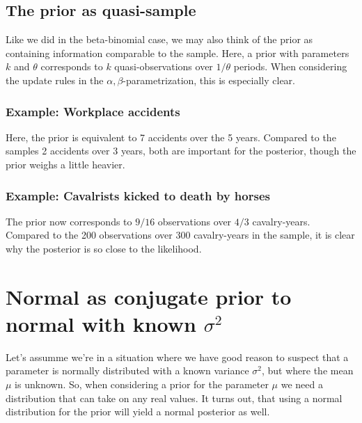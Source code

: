 \documentclass[12pt, a4paper]{article}
\begin{document}
\subsection{The prior as quasi-sample}
Like we did in the beta-binomial case, we may also think of the prior as containing information comparable to the sample. Here, a prior with parameters $k$ and $\theta$ corresponds to $k$ quasi-observations over $1/\theta$ periods. When considering the update rules in the $\alpha, \beta$-parametrization, this is especially clear.

\subsubsection{Example: Workplace accidents}
Here, the prior is equivalent to 7 accidents over the 5 years. Compared to the samples 2 accidents over 3 years, both are important for the posterior, though the prior weighs a little heavier.

\subsubsection{Example: Cavalrists kicked to death by horses}
The prior now corresponds to $9/16$ observations over $4/3$ cavalry-years. Compared to the 200 observations over 300 cavalry-years in the sample, it is clear why the posterior is so close to the likelihood.

\section{Normal as conjugate prior to normal with known $\sigma^2$}
Let's assumme we're in a situation where we have good reason to suspect that a parameter is normally distributed with a known variance $\sigma^2$, but where the mean $\mu$ is unknown. So, when considering a prior for the parameter $\mu$ we need a distribution that can take on any real values. It turns out, that using a normal distribution for the prior will yield a normal posterior as well.
\end{document}
